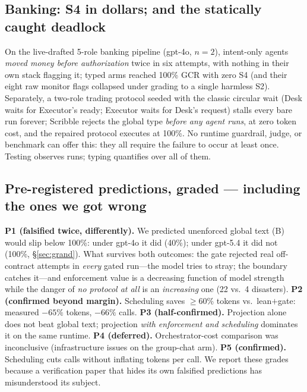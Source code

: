 \documentclass{article}
\begin{document}
\subsection{Banking: S4 in dollars; and the statically caught deadlock}
On the live-drafted 5-role banking pipeline (gpt-4o, $n{=}2$), intent-only agents \emph{moved money before authorization} twice in six attempts, with nothing in their own stack flagging it; typed arms reached 100\% GCR with zero S4 (and their eight raw monitor flags collapsed under grading to a single harmless S2). Separately, a two-role trading protocol seeded with the classic circular wait (Desk waits for Executor's ready; Executor waits for Desk's request) stalls every bare run forever; Scribble rejects the global type \emph{before any agent runs}, at zero token cost, and the repaired protocol executes at 100\%. No runtime guardrail, judge, or benchmark can offer this: they all require the failure to occur at least once. Testing observes runs; typing quantifies over all of them.

\subsection{Pre-registered predictions, graded --- including the ones we got wrong}\label{sec:honest}
\textbf{P1 (falsified twice, differently).} We predicted unenforced global text (B) would slip below 100\%: under gpt-4o it did (40\%); under gpt-5.4 it did not (100\%, \S\ref{sec:grand}). What survives both outcomes: the gate rejected real off-contract attempts in \emph{every} gated run---the model tries to stray; the boundary catches it---and enforcement value is a decreasing function of model strength while the danger of \emph{no protocol at all} is an \emph{increasing} one (22 vs.\ 4 disasters). \textbf{P2 (confirmed beyond margin).} Scheduling saves $\geq$60\% tokens vs.\ lean$+$gate: measured $-65\%$ tokens, $-66\%$ calls. \textbf{P3 (half-confirmed).} Projection alone does not beat global text; projection \emph{with enforcement and scheduling} dominates it on the same runtime. \textbf{P4 (deferred).} Orchestrator-cost comparison was inconclusive (infrastructure issues on the group-chat arm). \textbf{P5 (confirmed).} Scheduling cuts calls without inflating tokens per call. We report these grades because a verification paper that hides its own falsified predictions has misunderstood its subject.
\end{document}
